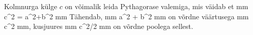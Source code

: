 Kolmnurga külge $c$ on võimalik leida Pythagorase valemiga, mis väidab et
mm c^2 = a^2+b^2 mm
Tähendab, mm a^2 + b^2 mm on võrdne väärtusega mm c^2 mm, kusjuures mm c^2/2 mm on võrdne poolega sellest.